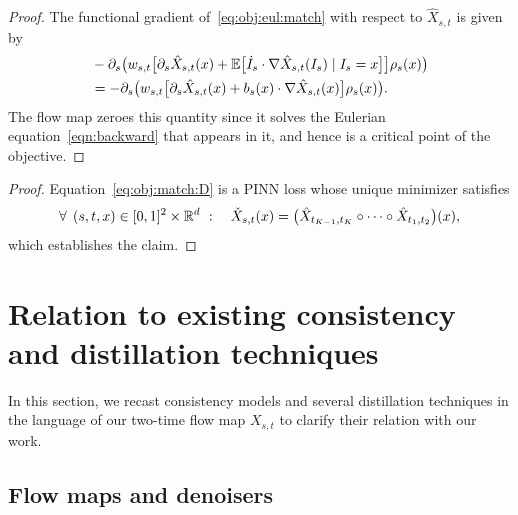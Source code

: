 \emm*

\begin{proof}
	The functional gradient of~\eqref{eq:obj:eul:match} with respect to $\hat{X}_{s, t}$ is given by
	\begin{equation}
		\begin{aligned}
			 & -\partial_s\big( w_{s,t} \big[ \partial_s \hat{X}_{s, t}(x) + \mathbb{E}\big[\dot{I}_s\cdot\nabla \hat{X}_{s, t}(I_s) \mid I_s = x\big] \big]\rho_s(x)\big) \\
			 & =  -\partial_s\big( w_{s,t} \big[\partial_s \hat{X}_{s, t}(x) + b_s(x) \cdot\nabla \hat{X}_{s, t}(x) \big]\rho_s(x)\big).
		\end{aligned}
	\end{equation}
	The flow map zeroes this quantity since it solves the Eulerian equation~\eqref{eqn:backward} that appears in it, and hence is a critical point of the objective.
\end{proof}

\fmmd*

\begin{proof}
	Equation~\eqref{eq:obj:match:D} is a PINN loss whose unique minimizer satisfies
	\begin{align}
		\label{eq:obj:match:D:s}
		\forall \:\: (s,t,x) \in [0,1]^2\times \mathbb{R}^d  \ :  \quad  \check X_{s,t} (x) = \big(\hat{X}_{t_{K-1}, t_K}\circ \cdots \circ \hat{X}_{t_1, t_2}\big)(x),
	\end{align}
	which establishes the claim.
\end{proof}






\section{Relation to existing consistency and distillation techniques}
\label{sec:app:relation}
In this section, we recast consistency models and several distillation techniques in the language of our two-time flow map $X_{s, t}$ to clarify their relation with our work.

\subsection{Flow maps and denoisers}
\label{se:fm:denoi}

